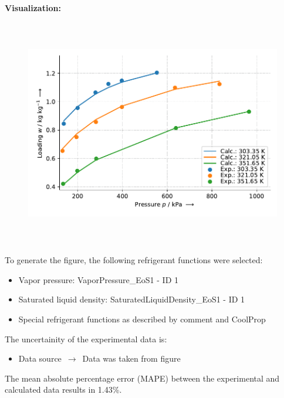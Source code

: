 \textbf{Visualization:}
%
\begin{figure}[!htp]
{\noindent\includegraphics[height=10cm, keepaspectratio]{figs/ads/ads_R-134a_activated_carbon_fiber_A-20_DubininAstakhov_1.pdf}}
\end{figure}
%

To generate the figure, the following refrigerant functions were selected:
\begin{itemize}
\item Vapor pressure: VaporPressure\_EoS1 - ID 1
\item Saturated liquid density: SaturatedLiquidDensity\_EoS1 - ID 1
\item Special refrigerant functions as described by comment and CoolProp
\end{itemize}

The uncertainity of the experimental data is:
\begin{itemize}
\item Data source $\,\to\,$ Data was taken from figure
\end{itemize}

The mean absolute percentage error (MAPE) between the experimental and calculated data results in 1.43\%.
\FloatBarrier
\newpage
